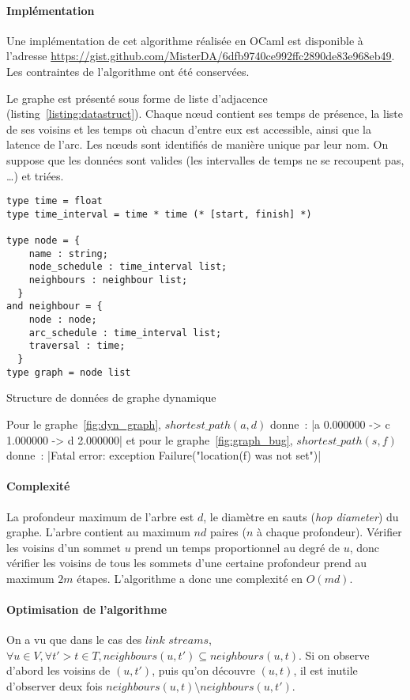 \documentclass[12pt,a4paper]{article}
\begin{document}
\paragraph{Implémentation}
Une implémentation de cet algorithme réalisée en OCaml est disponible
à l'adresse
\url{https://gist.github.com/MisterDA/6dfb9740ce992ffc2890de83e968eb49}. Les
contraintes de l'algorithme ont été conservées.

Le graphe est présenté sous forme de liste d'adjacence
(listing~\ref{listing:datastruct}). Chaque nœud contient ses temps de
présence, la liste de ses voisins et les temps où chacun d'entre eux
est accessible, ainsi que la latence de l'arc. Les nœuds sont
identifiés de manière unique par leur nom. On suppose que les données
sont valides (les intervalles de temps ne se recoupent pas, …)  et
triées.\\

\begin{listing}[h]
  \begin{verbatim}
type time = float
type time_interval = time * time (* [start, finish] *)

type node = {
    name : string;
    node_schedule : time_interval list;
    neighbours : neighbour list;
  }
and neighbour = {
    node : node;
    arc_schedule : time_interval list;
    traversal : time;
  }
type graph = node list
  \end{verbatim}
  \caption{Structure de données de graphe
    dynamique}\label{listing:datastruct}
\end{listing}

Pour le graphe~\ref{fig:dyn_graph}, \(shortest\_path(a, d)\) donne~:
|a 0.000000 -> c 1.000000 -> d 2.000000| et pour le
graphe~\ref{fig:graph_bug}, \(shortest\_path(s, f)\) donne~:
|Fatal error: exception Failure("location(f) was not set")|

\paragraph{Complexité} La profondeur maximum de l'arbre est \(d\), le
diamètre en sauts (\textit{hop diameter}) du graphe. L'arbre contient
au maximum \(n d\) paires (\(n\) à chaque profondeur). Vérifier les
voisins d'un sommet \(u\) prend un temps proportionnel au degré de
\(u\), donc vérifier les voisins de tous les sommets d'une certaine
profondeur prend au maximum \(2m\) étapes. L'algorithme a donc une
complexité en \(O(m d)\).

\paragraph{Optimisation de l'algorithme} On a vu que dans le cas des
\(\textit{link streams}\),
\(\forall u \in V, \forall t' > t \in T, neighbours(u, t') \subseteq
neighbours(u, t)\). Si on observe d'abord les voisins de \((u, t')\),
puis qu'on découvre \((u, t)\), il est inutile d'observer deux fois
\(neighbours(u, t) \setminus neighbours(u, t')\).
\end{document}
